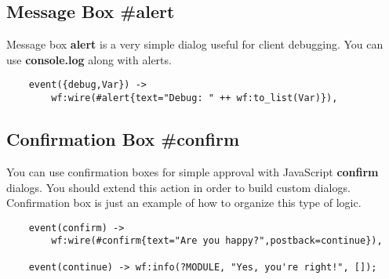\subsection{Message Box \#alert}
Message box {\bf alert} is a very simple dialog useful for client debugging.
You can use {\bf console.log} along with alerts.

\vspace{1\baselineskip}
\begin{lstlisting}
    event({debug,Var}) ->
        wf:wire(#alert{text="Debug: " ++ wf:to_list(Var)}),
\end{lstlisting}

\subsection{Confirmation Box \#confirm}
You can use confirmation boxes for simple approval with JavaScript {\bf confirm} dialogs.
You should extend this action in order to build custom dialogs. Confirmation box is just an example of how to
organize this type of logic.

\vspace{1\baselineskip}
\begin{lstlisting}
    event(confirm) ->
        wf:wire(#confirm{text="Are you happy?",postback=continue}),

    event(continue) -> wf:info(?MODULE, "Yes, you're right!", []);
\end{lstlisting}
\vspace{1\baselineskip}
